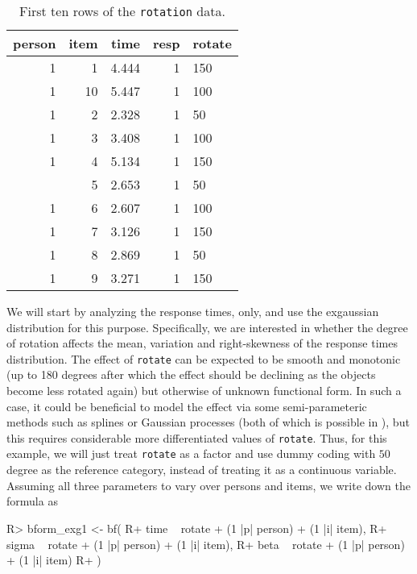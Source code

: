 \documentclass[jss]{jss}
\begin{document}
\begin{CodeChunk}
\begin{table}

\caption{\label{tab:head-rotation}First ten rows of the \texttt{rotation} data.}
\centering
\begin{tabular}[t]{rrrrl}
\toprule
person & item & time & resp & rotate\\
\midrule
1 & 1 & 4.444 & 1 & 150\\
1 & 10 & 5.447 & 1 & 100\\
1 & 2 & 2.328 & 1 & 50\\
1 & 3 & 3.408 & 1 & 100\\
1 & 4 & 5.134 & 1 & 150\\
\addlinespace
1 & 5 & 2.653 & 1 & 50\\
1 & 6 & 2.607 & 1 & 100\\
1 & 7 & 3.126 & 1 & 150\\
1 & 8 & 2.869 & 1 & 50\\
1 & 9 & 3.271 & 1 & 150\\
\bottomrule
\end{tabular}
\end{table}

\end{CodeChunk}

We will start by analyzing the response times, only, and use the
exgaussian distribution for this purpose. Specifically, we are
interested in whether the degree of rotation affects the mean, variation
and right-skewness of the response times distribution. The effect of
\texttt{rotate} can be expected to be smooth and monotonic (up to 180
degrees after which the effect should be declining as the objects become
less rotated again) but otherwise of unknown functional form. In such a
case, it could be beneficial to model the effect via some
semi-parameteric methods such as splines or Gaussian processes (both of
which is possible in ), but this requires considerable more
differentiated values of \texttt{rotate}. Thus, for this example, we
will just treat \texttt{rotate} as a factor and use dummy coding with
\(50\) degree as the reference category, instead of treating it as a
continuous variable. Assuming all three parameters to vary over persons
and items, we write down the formula as

\begin{CodeChunk}

\begin{CodeInput}
R> bform_exg1 <- bf(
R+   time ~ rotate + (1 |p| person) + (1 |i| item),
R+   sigma ~ rotate + (1 |p| person) + (1 |i| item),
R+   beta ~ rotate + (1 |p| person) + (1 |i| item)
R+ )
\end{CodeInput}
\end{CodeChunk}
\end{document}
